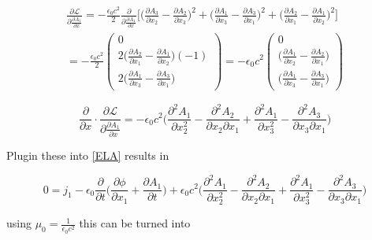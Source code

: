 \documentclass{article}
\begin{document}
\begin{equation}
\begin{split}
\frac{\partial \mathcal{L}}{\partial \frac{\partial A_1}{\partial x} }
= - \frac{\epsilon_0 c^2}{2} \frac{\partial}{\partial \frac{\partial A_1}{\partial x}}
\bigg[
\bigg(\frac{\partial A_3}{\partial x_2} - \frac{\partial A_2}{\partial x_3} \bigg)^2
+ \bigg(\frac{\partial A_1}{\partial x_3} - \frac{\partial A_3}{\partial x_1} \bigg)^2
+ \bigg(\frac{\partial A_2}{\partial x_1} - \frac{\partial A_1}{\partial x_2} \bigg)^2
\bigg]
\\
= 
- \frac{\epsilon_0 c^2}{2} 
\left(
\begin{array}{c} 
0
\\
2 \bigg(\frac{\partial A_2}{\partial x_1} - \frac{\partial A_1}{\partial x_2} \bigg) (-1)
\\
2 \bigg(\frac{\partial A_1}{\partial x_3} - \frac{\partial A_3}{\partial x_1} \bigg)
\end{array}
\right)
= 
- \epsilon_0 c^2
\left(
\begin{array}{c} 
0
\\
\bigg(\frac{\partial A_1}{\partial x_2} - \frac{\partial A_2}{\partial x_1} \bigg)
\\
\bigg(\frac{\partial A_1}{\partial x_3} - \frac{\partial A_3}{\partial x_1} \bigg)
\end{array}
\right)
\end{split}
\end{equation}

\begin{equation}
\frac{\partial}{\partial x} \cdot \frac{\partial \mathcal{L}}{\partial \frac{\partial A_1}{\partial x} }
= - \epsilon_0 c^2 
\bigg( \frac{\partial^2 A_1}{\partial x_2^2} - \frac{\partial^2 A_2}{\partial x_2 \partial x_1}
+ \frac{\partial^2 A_1}{\partial x_3^2} - \frac{\partial^2 A_3}{\partial x_3 \partial x_1} \bigg)
\end{equation}

Plugin these into \ref{ELA} results in

\begin{equation}
0= j_1 
- \epsilon_0 \frac{\partial}{\partial t} \bigg(\frac{\partial \phi}{\partial x_1} + \frac{\partial A_1}{\partial t} \bigg)
+ \epsilon_0 c^2 
\bigg( \frac{\partial^2 A_1}{\partial x_2^2} - \frac{\partial^2 A_2}{\partial x_2 \partial x_1}
+ \frac{\partial^2 A_1}{\partial x_3^2} - \frac{\partial^2 A_3}{\partial x_3 \partial x_1} \bigg)
\end{equation}

using $\mu_0 = \frac{1}{\epsilon_0 c^2}$ this can be turned into
\end{document}
